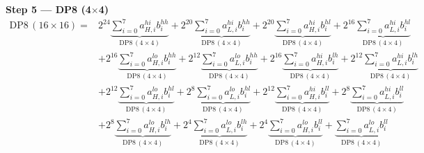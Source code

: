 \documentclass[fleqn]{article}
\newcommand{\DPop}[3]{\mathrm{DP#1}\,(#2\!\times\!#3)}
\begin{document}
\textbf{Step 5 --- DP8 (4$\times$4)}
\begin{align*}
\DPop{8}{16}{16} = {}
  & 2^{24}\underbrace{\sum_{i=0}^{7} a_{H,i}^{hi} b_i^{hh}}_{\DPop{8}{4}{4}}
  + 2^{20}\underbrace{\sum_{i=0}^{7} a_{L,i}^{hi} b_i^{hh}}_{\DPop{8}{4}{4}}
  + 2^{20}\underbrace{\sum_{i=0}^{7} a_{H,i}^{hi} b_i^{hl}}_{\DPop{8}{4}{4}}
  + 2^{16}\underbrace{\sum_{i=0}^{7} a_{L,i}^{hi} b_i^{hl}}_{\DPop{8}{4}{4}} \\[0.6em]
  & + 2^{16}\underbrace{\sum_{i=0}^{7} a_{H,i}^{lo} b_i^{hh}}_{\DPop{8}{4}{4}}
  + 2^{12}\underbrace{\sum_{i=0}^{7} a_{L,i}^{lo} b_i^{hh}}_{\DPop{8}{4}{4}}
  + 2^{16}\underbrace{\sum_{i=0}^{7} a_{H,i}^{hi} b_i^{lh}}_{\DPop{8}{4}{4}}
  + 2^{12}\underbrace{\sum_{i=0}^{7} a_{L,i}^{hi} b_i^{lh}}_{\DPop{8}{4}{4}} \\[0.6em]
  & + 2^{12}\underbrace{\sum_{i=0}^{7} a_{H,i}^{lo} b_i^{hl}}_{\DPop{8}{4}{4}}
  + 2^{8}\underbrace{\sum_{i=0}^{7} a_{L,i}^{lo} b_i^{hl}}_{\DPop{8}{4}{4}}
  + 2^{12}\underbrace{\sum_{i=0}^{7} a_{H,i}^{hi} b_i^{ll}}_{\DPop{8}{4}{4}}
  + 2^{8}\underbrace{\sum_{i=0}^{7} a_{L,i}^{hi} b_i^{ll}}_{\DPop{8}{4}{4}} \\[0.6em]
  & + 2^{8}\underbrace{\sum_{i=0}^{7} a_{H,i}^{lo} b_i^{lh}}_{\DPop{8}{4}{4}}
  + 2^{4}\underbrace{\sum_{i=0}^{7} a_{L,i}^{lo} b_i^{lh}}_{\DPop{8}{4}{4}}
  + 2^{4}\underbrace{\sum_{i=0}^{7} a_{H,i}^{lo} b_i^{ll}}_{\DPop{8}{4}{4}}
  + \underbrace{\sum_{i=0}^{7} a_{L,i}^{lo} b_i^{ll}}_{\DPop{8}{4}{4}}
\end{align*}
\end{document}

